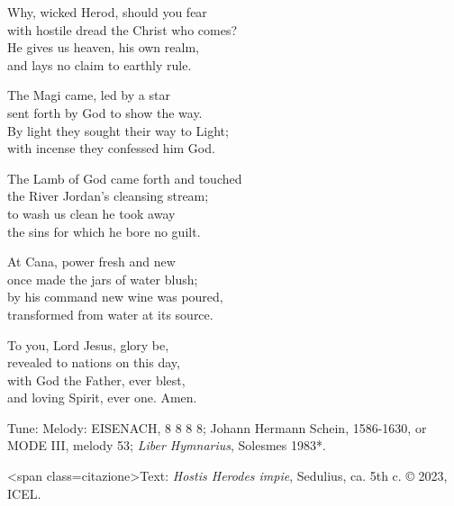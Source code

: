 \hymn

\settowidth{\versewidth}{with hostile dread the Christ who comes?}

\begin{hymnverse}%
Why, wicked Herod, should you fear\\
with hostile dread the Christ who comes?\\
He gives us heaven, his own realm,\\
and lays no claim to earthly rule.

The Magi came, led by a star\\
sent forth by God to show the way.\\
By light they sought their way to Light;\\
with incense they confessed him God.

The Lamb of God came forth and touched\\
the River Jordan’s cleansing stream;\\
to wash us clean he took away\\
the sins for which he bore no guilt.

At Cana, power fresh and new\\
once made the jars of water blush;\\
by his command new wine was poured,\\
transformed from water at its source.

To you, Lord Jesus, glory be,\\
revealed to nations on this day,\\
with God the Father, ever blest,\\
and loving Spirit, ever one. Amen.
\end{hymnverse}

\begin{hymnsource}
Tune: Melody: EISENACH, 8 8 8 8; Johann Hermann Schein, 1586-1630, or MODE III, melody 53; \emph{Liber Hymnarius}, Solesmes 1983*.

<span class=citazione>Text: \emph{Hostis Herodes impie}, Sedulius, ca. 5th c. © 2023, ICEL.
\end{hymnsource}